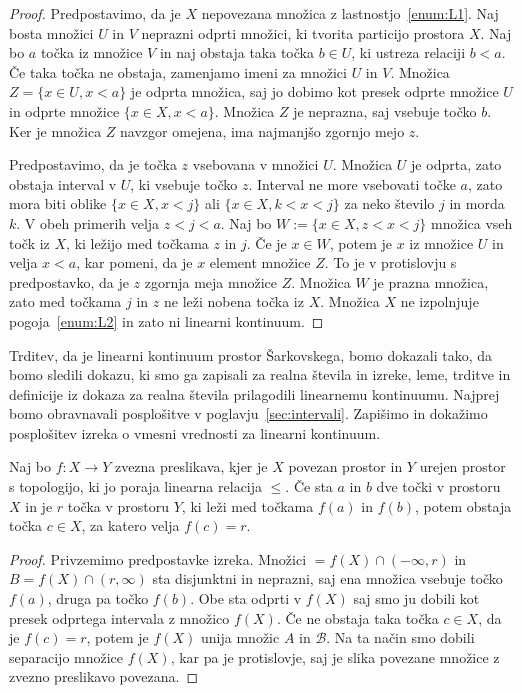 \documentclass[../TG_magistrsko_delo_sections.tex]{subfiles}
\begin{document}
\begin{proof}
Predpostavimo, da je $X$ nepovezana množica z lastnostjo~\ref{enum:L1}. Naj bosta množici $U$ in $V$ neprazni odprti množici, ki tvorita particijo prostora $X$. Naj bo $a$ točka iz množice $V$ in naj obstaja taka točka $b \in U$, ki ustreza relaciji $b<a$. Če taka točka ne obstaja, zamenjamo imeni za množici $U$ in $V$. Množica $Z = \{x \in U, x<a\}$ je odprta množica, saj jo dobimo kot presek odprte množice $U$ in odprte množice $\{x \in X, x<a\}$. Množica $Z$ je neprazna, saj vsebuje točko $b$. Ker je množica $Z$ navzgor omejena, ima najmanjšo zgornjo mejo $z$.

Predpostavimo, da je točka $z$ vsebovana v množici $U$. Množica $U$ je odprta, zato obstaja interval v $U$, ki vsebuje točko $z$. Interval ne more vsebovati točke $a$, zato mora biti oblike $\{x \in X, x<j\}$ ali $\{x \in X, k<x<j\}$ za neko število $j$ in morda $k$. V obeh primerih velja $z<j<a$. Naj bo $W:=\{x \in X, z<x<j\}$ množica vseh točk iz $X$, ki ležijo med točkama $z$ in $j$. Če je $x \in W$, potem je $x$ iz množice $U$ in velja $x<a$, kar pomeni, da je $x$ element množice $Z$. To je v protislovju s predpostavko, da je $z$ zgornja meja množice $Z$. Množica $W$ je prazna množica, zato med točkama $j$ in $z$ ne leži nobena točka iz $X$. Množica $X$ ne izpolnjuje pogoja~\ref{enum:L2} in zato ni linearni kontinuum.
\end{proof}

Trditev, da je linearni kontinuum prostor Šarkovskega, bomo dokazali tako, da bomo sledili dokazu, ki smo ga zapisali za realna števila in izreke, leme, trditve in definicije iz dokaza za realna števila prilagodili linearnemu kontinuumu. Najprej bomo obravnavali posplošitve v poglavju~\ref{sec:intervali}. Zapišimo in dokažimo posplošitev izreka o vmesni vrednosti za linearni kontinuum.

\begin{izrek}
Naj bo $f : X \to Y$ zvezna preslikava, kjer je $X$ povezan prostor in $Y$ urejen prostor s topologijo, ki jo poraja linearna relacija $\leq$. Če sta $a$ in $b$ dve točki v prostoru $X$ in je $r$ točka v prostoru $Y$, ki leži med točkama $f(a)$ in $f(b)$, potem obstaja točka $c \in X$, za katero velja $f(c) = r$.
\end{izrek}
\begin{proof}
Privzemimo predpostavke izreka. Množici $=f(X) \cap (-\infty, r)$ in $B=f(X) \cap (r, \infty)$ sta disjunktni in neprazni, saj ena množica vsebuje točko $f(a)$, druga pa točko $f(b)$. Obe sta odprti v $f(X)$ saj smo ju dobili kot presek odprtega intervala z množico $f(X)$. Če ne obstaja taka točka $c \in X$, da je $f(c) = r$, potem je $f(X)$ unija množic $A$ in $\mathcal{B}$. Na ta način smo dobili separacijo množice $f(X)$, kar pa je protislovje, saj je slika povezane množice z zvezno preslikavo povezana.
\end{proof}
\end{document}
